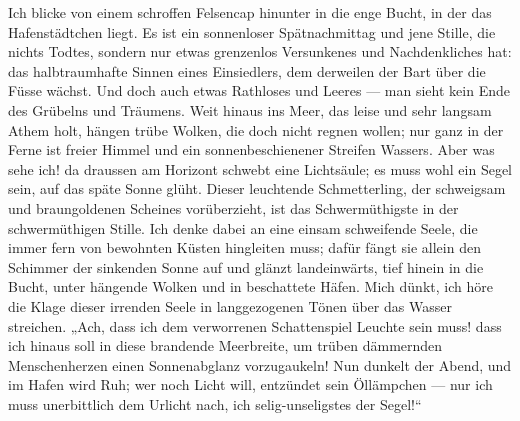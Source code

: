 Ich blicke von einem schroffen Felsencap hinunter in die enge Bucht, in der das Hafenstädtchen liegt. Es ist ein sonnenloser Spätnachmittag und jene Stille, die nichts Todtes, sondern nur etwas grenzenlos Versunkenes und Nachdenkliches hat: das halbtraumhafte Sinnen eines Einsiedlers, dem derweilen der Bart über die Füsse wächst. Und doch auch etwas Rathloses und Leeres — man sieht kein Ende des Grübelns und Träumens. Weit hinaus ins Meer, das leise und sehr langsam Athem holt, hängen trübe Wolken, die doch nicht regnen wollen; nur ganz in der Ferne ist freier Himmel und ein sonnenbeschienener Streifen Wassers. Aber was sehe ich! da draussen am Horizont schwebt eine Lichtsäule; es muss wohl ein Segel sein, auf das späte Sonne glüht. Dieser leuchtende Schmetterling, der schweigsam und braungoldenen Scheines vorüberzieht, ist das Schwermüthigste in der schwermüthigen Stille. Ich denke dabei an eine einsam schweifende Seele, die immer fern von bewohnten Küsten hingleiten muss; dafür fängt sie allein den Schimmer der sinkenden Sonne auf und glänzt landeinwärts, tief hinein in die Bucht, unter hängende Wolken und in beschattete Häfen. Mich dünkt, ich höre die Klage dieser irrenden Seele in langgezogenen Tönen über das Wasser streichen. „Ach, dass ich dem verworrenen Schattenspiel Leuchte sein muss! dass ich hinaus soll in diese brandende Meerbreite, um trüben dämmernden Menschenherzen einen Sonnenabglanz vorzugaukeln! Nun dunkelt der Abend, und im Hafen wird Ruh; wer noch Licht will, entzündet sein Öllämpchen — nur ich muss unerbittlich dem Urlicht nach, ich selig-unseligstes der Segel!“
\par

